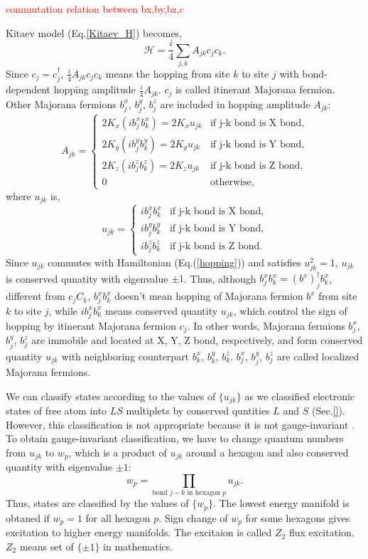 \textcolor{red}{commutation relation between bx,by,bz,c}

Kitaev model (Eq.\ref{Kitaev_H}) becomes,
\begin{equation}
\mathcal{H} = \frac{i}{4}\sum_{j,k}A_{jk}c_jc_k.
\label{hopping}
\end{equation}
Since $c_j = c^\dag_j$, $\frac{i}{4}A_{jk}c_jc_k$ means the hopping from site $k$ to site $j$ with bond-dependent hopping amplitude $\frac{i}{4}A_{jk}$.
$c_j$ is called itinerant Majorana fermion.
Other Majorana fermions $b^x_j$, $b^y_j$, $b^z_j$ are included in hopping amplitude $A_{jk}$:
\begin{equation}
A_{jk} = \begin{cases}
2K_x(ib^x_jb^x_k) = 2K_xu_{jk} & \text{if j-k bond is X bond,}\\
2K_y(ib^y_jb^y_k) = 2K_yu_{jk} & \text{if j-k bond is Y bond,}\\
2K_z(ib^z_jb^z_k) = 2K_zu_{jk} & \text{if j-k bond is Z bond,}\\
0 & \text{otherwise,}
\end{cases}
\end{equation}
where $u_{jk}$ is,
\begin{equation}
u_{jk} = \begin{cases}
ib^x_jb^x_k & \text{if j-k bond is X bond,}\\
ib^y_jb^y_k & \text{if j-k bond is Y bond,}\\
ib^z_jb^z_k & \text{if j-k bond is Z bond.}
\end{cases}
\end{equation}
Since $u_{jk}$ commutes with Hamiltonian (Eq.(\ref{hopping})) and satisfies $u^2_{jk} = 1$, $u_{jk}$ is conserved qunatity with eigenvalue $\pm1$.
Thus, although $b^x_jb^x_k = (b^x)^\dag_jb^x_k$, different from $c_jC_k$, $b^x_jb^x_k$ doesn't mean hopping of Majorana fermion $b^x$ from site $k$ to site $j$, while $ib^x_jb^x_k$ means conserved quantity $u_{jk}$, which control the sign of hopping by itinerant Majorana fermion $c_j$.
In other words, Majorana fermions $b^x_j$, $b^y_j$, $b^z_j$ are immobile and located at X, Y, Z bond, respectively, and form conserved quantity $u_{jk}$ with neighboring counterpart $b^x_k$, $b^y_k$, $b^z_k$.
$b^x_j$, $b^y_j$, $b^z_j$ are called localized Majorana fermions.

We can classify states according to the values of $\{u_{jk}\}$ as we classified electronic states of free atom into $LS$ multiplets by conserved quntities $L$ and $S$ (Sec.\ref{}).
However, this classification is not appropriate because it is not gauge-invariant \cite{}.
To obtain gauge-invariant classification, we have to change quantum numbers from $u_{jk}$ to $w_p$, which is a product of $u_{jk}$ around a hexagon and also conserved quantity with eigenvalue $\pm1$:
\begin{equation}
  w_p = \prod_\text{bond $j-k$ in hexagon $p$}u_{jk}.
\end{equation}
Thus, states are classified by the values of $\{w_p\}$.
The lowest energy manifold is obtaned if $w_p = 1$ for all hexagon $p$.
Sign change of $w_p$ for some hexagons gives excitation to higher energy manifolds.
The excitaion is called $Z_2$ flux excitation.
$Z_2$ means set of $\{\pm1\}$ in mathematics.

